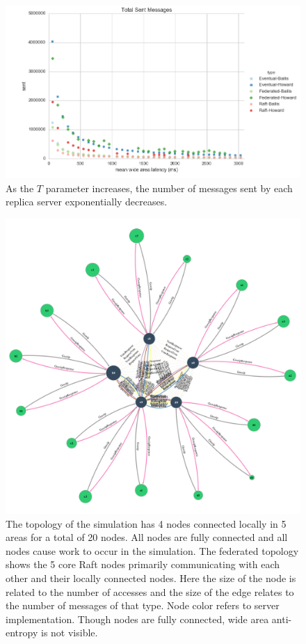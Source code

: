 \documentclass[11pt,letterpaper]{article}
\begin{document}
\begin{figure}[!h]
    \centering
        \includegraphics[width=\textwidth]{figures/messages_sent.png}
        \caption{\textsf{As the $T$ parameter increases, the number of messages sent by each replica server exponentially decreases.}}
        \label{fig:messages_sent}
\end{figure}

\begin{figure}[!h]
    \centering
        \includegraphics[width=\textwidth]{figures/federated-topology.png}
        \caption{\textsf{The topology of the simulation has 4 nodes connected locally in 5 areas for a total of 20 nodes. All nodes are fully connected and all nodes cause work to occur in the simulation. The federated topology shows the 5 core Raft nodes primarily communicating with each other and their locally connected nodes. Here the size of the node is related to the number of accesses and the size of the edge relates to the number of messages of that type. Node color refers to server implementation. Though nodes are fully connected, wide area anti-entropy is not visible.}}
        \label{fig:topology}
\end{figure}
\end{document}
